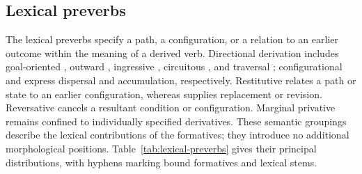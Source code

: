 \pex
\a {} 
\a {}  
\a {} 
\xe

\subsection{Lexical preverbs}\label{sec:lexical-preverbs}

The lexical preverbs specify a path, a configuration, or a relation to an
earlier outcome within the meaning of a derived verb. Directional derivation
includes goal-oriented , outward , ingressive ,
circuitous , and traversal ; configurational
 and  express dispersal and accumulation, respectively.
Restitutive  relates a path or state to an earlier configuration,
whereas  supplies replacement or revision. Reversative 
cancels a resultant condition or configuration. Marginal privative
 remains confined to individually specified derivatives. These
semantic groupings describe the lexical contributions of the formatives;
they introduce no additional morphological positions.
Table~\ref{tab:lexical-preverbs} gives their principal distributions, with
hyphens marking bound formatives and lexical stems.

